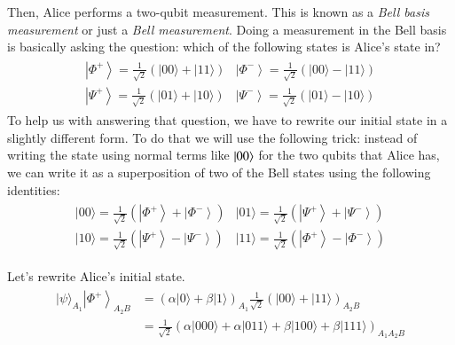 Then, Alice performs a two-qubit measurement. This is known as a \emph{Bell basis measurement} or just a \emph{Bell measurement}.
Doing a measurement in the Bell basis is basically asking the question: which of the following states is Alice's state in? 
\begin{align}
    \begin{array}{ll}
\left|\Phi^{+}\right\rangle=\frac{1}{\sqrt{2}}(|00\rangle+|11\rangle) & \left|\Phi^{-}\right\rangle=\frac{1}{\sqrt{2}}(|00\rangle-|11\rangle) \\
\left|\Psi^{+}\right\rangle=\frac{1}{\sqrt{2}}(|01\rangle+|10\rangle) & \left|\Psi^{-}\right\rangle=\frac{1}{\sqrt{2}}(|01\rangle-|10\rangle)
\end{array}
\end{align}
To help us with answering that question, we have to rewrite our initial state in a slightly different form. To do that we will use the following trick: instead of writing the state using normal terms like $\left| 00 \right\rangle$ for the two qubits that Alice has, we can write it as a superposition of two of the Bell states using the following identities:
\begin{align}
    \begin{array}{ll}
|00\rangle=\frac{1}{\sqrt{2}}\left(\left|\Phi^{+}\right\rangle+\left|\Phi^{-}\right\rangle\right) & |01\rangle=\frac{1}{\sqrt{2}}\left(\left|\Psi^{+}\right\rangle+\left|\Psi^{-}\right\rangle\right) \\
|10\rangle=\frac{1}{\sqrt{2}}\left(\left|\Psi^{+}\right\rangle-\left|\Psi^{-}\right\rangle\right) & |11\rangle=\frac{1}{\sqrt{2}}\left(\left|\Phi^{+}\right\rangle-\left|\Phi^{-}\right\rangle\right)
\end{array}
\end{align}

Let's rewrite Alice's initial state. %
\begin{align}
    \begin{aligned}
|\psi\rangle_{A_{1}}\left|\Phi^{+}\right\rangle_{A_{2} B} &=(\alpha|0\rangle+\beta|1\rangle)_{A_{1}} \frac{1}{\sqrt{2}}(|00\rangle+|11\rangle)_{A_{2} B} \\
&=\frac{1}{\sqrt{2}}(\alpha|000\rangle+\alpha|011\rangle+\beta|100\rangle+\beta|111\rangle)_{A_{1} A_{2} B}
\end{aligned}
\end{align}

